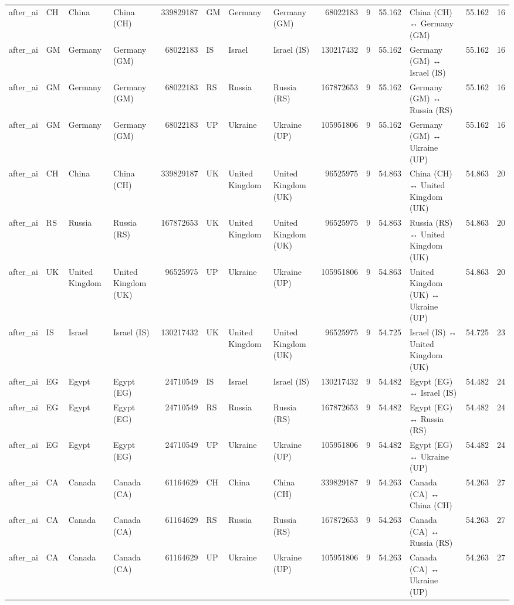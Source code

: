 \begin{tabular}{llllrlllrrrlrr}
after\_ai & CH & China & China (CH) & 339829187 & GM & Germany & Germany (GM) & 68022183 & 9 & 55.162 & China (CH) ↔ Germany (GM) & 55.162 & 16 \\
after\_ai & GM & Germany & Germany (GM) & 68022183 & IS & Israel & Israel (IS) & 130217432 & 9 & 55.162 & Germany (GM) ↔ Israel (IS) & 55.162 & 16 \\
after\_ai & GM & Germany & Germany (GM) & 68022183 & RS & Russia & Russia (RS) & 167872653 & 9 & 55.162 & Germany (GM) ↔ Russia (RS) & 55.162 & 16 \\
after\_ai & GM & Germany & Germany (GM) & 68022183 & UP & Ukraine & Ukraine (UP) & 105951806 & 9 & 55.162 & Germany (GM) ↔ Ukraine (UP) & 55.162 & 16 \\
after\_ai & CH & China & China (CH) & 339829187 & UK & United Kingdom & United Kingdom (UK) & 96525975 & 9 & 54.863 & China (CH) ↔ United Kingdom (UK) & 54.863 & 20 \\
after\_ai & RS & Russia & Russia (RS) & 167872653 & UK & United Kingdom & United Kingdom (UK) & 96525975 & 9 & 54.863 & Russia (RS) ↔ United Kingdom (UK) & 54.863 & 20 \\
after\_ai & UK & United Kingdom & United Kingdom (UK) & 96525975 & UP & Ukraine & Ukraine (UP) & 105951806 & 9 & 54.863 & United Kingdom (UK) ↔ Ukraine (UP) & 54.863 & 20 \\
after\_ai & IS & Israel & Israel (IS) & 130217432 & UK & United Kingdom & United Kingdom (UK) & 96525975 & 9 & 54.725 & Israel (IS) ↔ United Kingdom (UK) & 54.725 & 23 \\
after\_ai & EG & Egypt & Egypt (EG) & 24710549 & IS & Israel & Israel (IS) & 130217432 & 9 & 54.482 & Egypt (EG) ↔ Israel (IS) & 54.482 & 24 \\
after\_ai & EG & Egypt & Egypt (EG) & 24710549 & RS & Russia & Russia (RS) & 167872653 & 9 & 54.482 & Egypt (EG) ↔ Russia (RS) & 54.482 & 24 \\
after\_ai & EG & Egypt & Egypt (EG) & 24710549 & UP & Ukraine & Ukraine (UP) & 105951806 & 9 & 54.482 & Egypt (EG) ↔ Ukraine (UP) & 54.482 & 24 \\
after\_ai & CA & Canada & Canada (CA) & 61164629 & CH & China & China (CH) & 339829187 & 9 & 54.263 & Canada (CA) ↔ China (CH) & 54.263 & 27 \\
after\_ai & CA & Canada & Canada (CA) & 61164629 & RS & Russia & Russia (RS) & 167872653 & 9 & 54.263 & Canada (CA) ↔ Russia (RS) & 54.263 & 27 \\
after\_ai & CA & Canada & Canada (CA) & 61164629 & UP & Ukraine & Ukraine (UP) & 105951806 & 9 & 54.263 & Canada (CA) ↔ Ukraine (UP) & 54.263 & 27 \\

\end{tabular}

